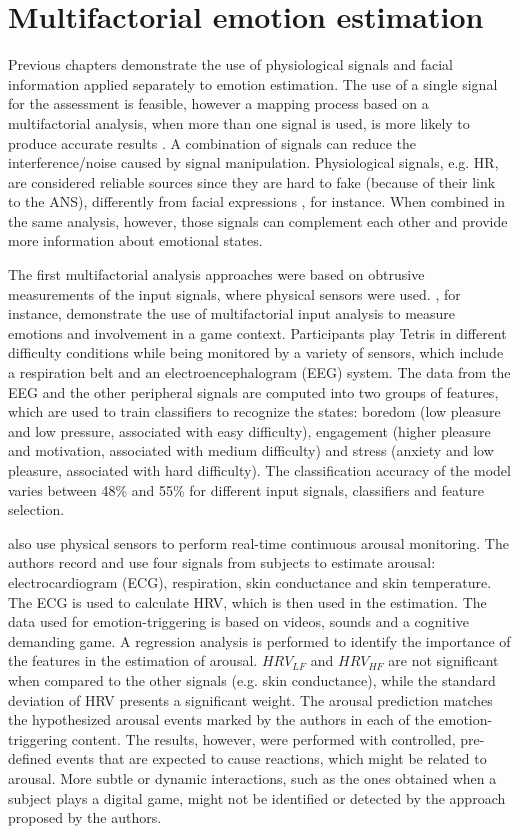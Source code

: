 \chapter{Multifactorial emotion estimation}

Previous chapters demonstrate the use of physiological signals and facial information applied separately to emotion estimation. The use of a single signal for the assessment is feasible, however a mapping process based on a multifactorial analysis, when more than one signal is used, is more likely to produce accurate results \parencite{kukolja2014comparative}. A combination of signals can reduce the interference/noise caused by signal manipulation. Physiological signals, e.g. HR, are considered reliable sources since they are hard to fake (because of their link to the ANS), differently from facial expressions \parencite{Landowska}, for instance. When combined in the same analysis, however, those signals can complement each other and provide more information about emotional states.

The first multifactorial analysis approaches were based on obtrusive measurements of the input signals, where physical sensors were used. \textcite{Chanel_2011}, for instance, demonstrate the use of multifactorial input analysis to measure emotions and involvement in a game context. Participants play Tetris in different difficulty conditions while being monitored by a variety of sensors, which include a respiration belt and an electroencephalogram (EEG) system. The data from the EEG and the other peripheral signals are computed into two groups of features, which are used to train classifiers to recognize the states: boredom (low pleasure and low pressure, associated with easy difficulty), engagement (higher pleasure and motivation, associated with medium difficulty) and stress (anxiety and low pleasure, associated with hard difficulty). The classification accuracy of the model varies between 48\% and 55\% for different input signals, classifiers and feature selection.

\textcite{grundlehner2009design} also use physical sensors to perform real-time continuous arousal monitoring. The authors record and use four signals from subjects to estimate arousal: electrocardiogram (ECG), respiration, skin conductance and skin temperature. The ECG is used to calculate HRV, which is then used in the estimation. The data used for emotion-triggering is based on videos, sounds and a cognitive demanding game. A regression analysis is performed to identify the importance of the features in the estimation of arousal. $HRV_{LF}$ and $HRV_{HF}$ are not significant when compared to the other signals (e.g. skin conductance), while the standard deviation of HRV presents a significant weight. The arousal prediction matches the hypothesized arousal events marked by the authors in each of the emotion-triggering content. The results, however, were performed with controlled, pre-defined events that are expected to cause reactions, which might be related to arousal. More subtle or dynamic interactions, such as the ones obtained when a subject plays a digital game, might not be identified or detected by the approach proposed by the authors.

